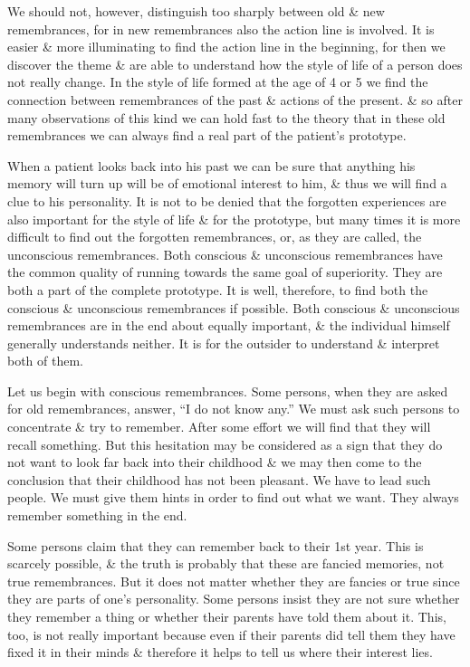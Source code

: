 \documentclass{article}
\numberwithin{equation}{section}
\begin{document}
We should not, however, distinguish too sharply between old \& new remembrances, for in new remembrances also the action line is involved. It is easier \& more illuminating to find the action line in the beginning, for then we discover the theme \& are able to understand how the style of life of a person does not really change. In the style of life formed at the age of 4 or 5 we find the connection between remembrances of the past \& actions of the present. \& so after many observations of this kind we can hold fast to the theory that in these old remembrances we can always find a real part of the patient's prototype.

When a patient looks back into his past we can be sure that anything his memory will turn up will be of emotional interest to him, \& thus we will find a clue to his personality. It is not to be denied that the forgotten experiences are also important for the style of life \& for the prototype, but many times it is more difficult to find out the forgotten remembrances, or, as they are called, the unconscious remembrances. Both conscious \& unconscious remembrances have the common quality of running towards the same goal of superiority. They are both a part of the complete prototype. It is well, therefore, to find both the conscious \& unconscious remembrances if possible. Both conscious \& unconscious remembrances are in the end about equally important, \& the individual himself generally understands neither. It is for the outsider to understand \& interpret both of them.

Let us begin with conscious remembrances. Some persons, when they are asked for old remembrances, answer, ``I do not know any.'' We must ask such persons to concentrate \& try to remember. After some effort we will find that they will recall something. But this hesitation may be considered as a sign that they do not want to look far back into their childhood \& we may then come to the conclusion that their childhood has not been pleasant. We have to lead such people. We must give them hints in order to find out what we want. They always remember something in the end.

Some persons claim that they can remember back to their 1st year. This is scarcely possible, \& the truth is probably that these are fancied memories, not true remembrances. But it does not matter whether they are fancies or true since they are parts of one's personality. Some persons insist they are not sure whether they remember a thing or whether their parents have told them about it. This, too, is not really important because even if their parents did tell them they have fixed it in their minds \& therefore it helps to tell us where their interest lies.
\end{document}
